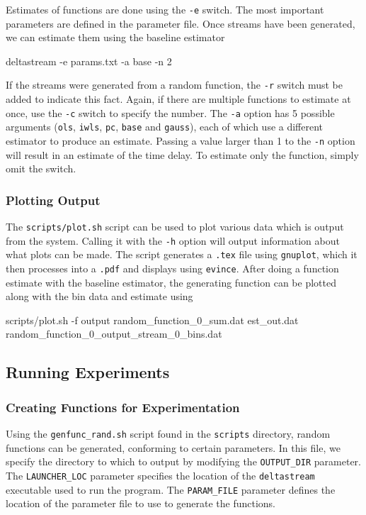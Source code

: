 \documentclass[a4paper,11pt]{article}
\begin{document}
\begin{appendices}
    Estimates of functions are done using the \texttt{-e} switch. The most
    important parameters are defined in the parameter file. Once streams have
    been generated, we can estimate them using the baseline estimator
    \begin{verbatimtab}
    deltastream -e params.txt -a base -n 2
    \end{verbatimtab}
    If the streams were generated from a random function, the \texttt{-r} switch
    must be added to indicate this fact. Again, if there are multiple functions
    to estimate at once, use the \texttt{-c} switch to specify the number. The
    \texttt{-a} option has 5 possible arguments (\texttt{ols}, \texttt{iwls},
    \texttt{pc}, \texttt{base} and \texttt{gauss}), each of which use a
    different estimator to produce an estimate. Passing a value larger than 1 to
    the \texttt{-n} option will result in an estimate of the time delay. To
    estimate only the function, simply omit the switch.
\subsubsection{Plotting Output}
\label{sec-10-2-4}

    The \texttt{scripts/plot.sh} script can be used to plot various data which
    is output from the system. Calling it with the \texttt{-h} option will
    output information about what plots can be made. The script generates a
    \texttt{.tex} file using \texttt{gnuplot}, which it then processes into a
    \texttt{.pdf} and displays using \texttt{evince}. After doing a function
    estimate with the baseline estimator, the generating function can be plotted
    along with the bin data and estimate using 
    \begin{verbatimtab}
    scripts/plot.sh -f output random_function_0_sum.dat est_out.dat
    random_function_0_output_stream_0_bins.dat
    \end{verbatimtab}
\subsection{Running Experiments}
\label{sec-10-3}
\subsubsection{Creating Functions for Experimentation}
\label{sec-10-3-1}

    Using the \texttt{genfunc\_rand.sh} script found in the \texttt{scripts} directory, random
    functions can be generated, conforming to certain parameters. In this file,
    we specify the directory to which to output by modifying the
    \texttt{OUTPUT\_DIR} parameter. The \texttt{LAUNCHER\_LOC} parameter specifies the
    location of the \texttt{deltastream} executable used to run the program. The
    \texttt{PARAM\_FILE} parameter defines the location of the parameter file to use
    to generate the functions.


\end{appendices}
\end{document}
